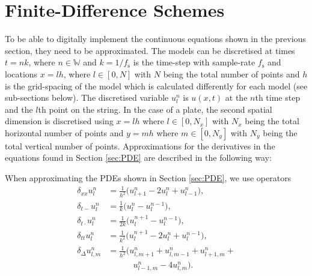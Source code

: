 \documentclass{article}
\begin{document}
\section{Finite-Difference Schemes}\label{sec:FDS}
To be able to digitally implement the continuous equations shown in the previous section, they need to be approximated. The models can be discretised at times $t = nk$, where $n \in \mathbb{W}$ and $k = 1 / f_\text{s}$ is the time-step with sample-rate $f_\text{s}$ and locations $x = lh$, where $l \in [0,N]$ with $N$ being the total number of points and $h$ is the grid-spacing of the model which is calculated differently for each model (see sub-sections below). The discretised variable $u_l^n$ is $u(x,t)$ at the $n$th time step and the $l$th point on the string. In the case of a plate, the second spatial dimension is discretised using $x = lh$ where $l \in [0,N_x]$ with $N_x$ being the total horizontal number of points and $y = mh$ where $m \in [0,N_y]$ with $N_y$ being the total vertical number of points. 
Approximations for the derivatives in the equations found in Section \ref{sec:PDE} are described in the following way: 

When approximating the PDEs shown in Section \ref{sec:PDE}, we use operators 
    \begin{align}
        \label{eq:secondSpacex}\delta_{xx}u_l^n &= \frac{1}{h^2}\big(u_{l+1}^n - 2u_l^n + u_{l-1}^n\big),\\
        \label{eq:backwardsTime}\delta_{t-} u^n_l &= \frac{1}{k}\big(u_l^{n}-u_l^{n-1}\big),\\
        \label{eq:centerTime}\delta_{t\cdot} u^n_l &= \frac{1}{2k}\big(u_l^{n+1}-u_l^{n-1}\big),\\
        \label{eq:secondTime}\delta_{tt}u_l^n &= \frac{1}{k^2} \big(u_l^{n+1} - 2u_l^n + u_l^{n-1}\big),\\
         \label{eq:2D}\delta_\Delta u_{l,m}^n &= \frac{1}{h^2}\big(u_{l,m+1}^n+u_{l,m-1}^n+u_{l+1,m}^n+ \\
         & \qquad \quad u_{l-1,m}^n - 4u_{l,m}^n\big).
    \end{align}
\end{document}
